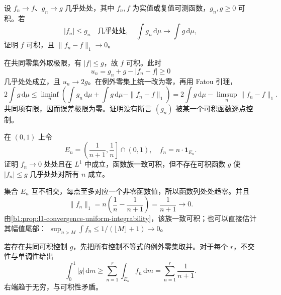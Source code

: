 \begin{exercise}\label{b1:ex:0503}
设 \(f_n\to f\)、\(g_n\to g\) 几乎处处，其中 \(f_n,f\) 为实值或复值可测函数，\(g_n,g\geq0\) 可积。若
\[
|f_n|\leq g_n\quad\text{几乎处处},
\quad
\int g_n\,\mathrm d\mu\longrightarrow\int g\,\mathrm d\mu,
\]
证明 \(f\) 可积，且 \(\|f_n-f\|_1\to0\)。
\end{exercise}
\begin{solution}
在共同零集外取极限，有 \(|f|\leq g\)，故 \(f\) 可积。此时
\[
u_n=g_n+g-|f_n-f|\geq0
\]
几乎处处成立，且 \(u_n\to2g\)。在例外零集上统一改为零，再用 Fatou 引理，
\[
2\int g\,\mathrm d\mu
\leq\liminf_n\left(\int g_n\,\mathrm d\mu+\int g\,\mathrm d\mu-\|f_n-f\|_1\right)
=2\int g\,\mathrm d\mu-\limsup_n\|f_n-f\|_1.
\]
共同项有限，因而误差极限为零。证明没有断言 \((g_n)\) 被某一个可积函数逐点控制。
\end{solution}

\begin{exercise}\label{b1:ex:0504}
在 \((0,1)\) 上令
\[
E_n=\left(\frac1{n+1},\frac1n\right]\cap(0,1),
\quad f_n=n\cdot\mathbf1_{E_n}.
\]
证明 \(f_n\to0\) 处处且在 \(L^1\) 中成立，函数族一致可积，但不存在可积函数 \(g\) 使 \(|f_n|\leq g\) 几乎处处对所有 \(n\) 成立。
\end{exercise}
\begin{solution}
集合 \(E_n\) 互不相交，每点至多对应一个非零函数值，所以函数列处处趋零。并且
\[
\|f_n\|_1=n\left(\frac1n-\frac1{n+1}\right)=\frac1{n+1}\longrightarrow0.
\]
由\cref{b1:prop:l1-convergence-uniform-integrability}，该族一致可积；也可以直接估计其幅值尾部：
\(\sup_{n>M}\int f_n\leq1/(\lfloor M\rfloor+1)\to0\)。

若存在共同可积控制 \(g\)，先把所有控制不等式的例外零集取并。对于每个 \(r\)，不交性与单调性给出
\[
\int_0^1 |g|\,\mathrm dm\geq\sum_{n=1}^{r}\int_{E_n}f_n\,\mathrm dm
=\sum_{n=1}^{r}\frac1{n+1}.
\]
右端趋于无穷，与可积性矛盾。
\end{solution}

